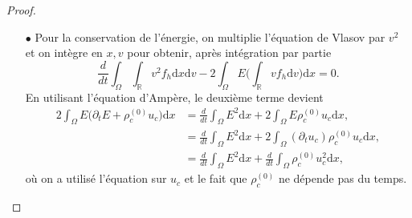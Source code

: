 \begin{proof}
\begin{enumerate}

    \item[$\bullet$] Pour la conservation de l'énergie, on multiplie l'équation de Vlasov par $v^2$ et on intègre en $x,v$ pour obtenir, après intégration par partie
      $$  
        \frac{d}{dt} \int_\Omega\int_{\mathbb{R}} v^2 f_h \mathrm{d}x \mathrm{d}v - 2 \int_\Omega E \Big(\int_{\mathbb{R}} v f_h \mathrm{d}v\Big)\mathrm{d}x = 0.
      $$
      En utilisant l'équation d'Ampère, le deuxième terme devient 
      $$
        \begin{aligned}
          2 \int_\Omega E \Big( \partial_t E + \rho^{(0)}_c u_c\Big)\mathrm{d}x
            &=  \frac{d}{dt} \int_\Omega E^2\mathrm{d}x  +2 \int_\Omega E \rho^{(0)}_c u_c \mathrm{d}x, \\
            &= \frac{d}{dt} \int_\Omega E^2\mathrm{d}x  + 2\int_\Omega (\partial_t u_c ) \rho^{(0)}_c u_c \mathrm{d}x, \\ 
            &= \frac{d}{dt} \int_\Omega E^2\mathrm{d}x  + \frac{d}{dt} \int_\Omega \rho_c^{(0)} u_c^2 \mathrm{d}x, 
        \end{aligned}
      $$
      où on a utilisé l'équation sur $u_c$ et le fait que $\rho_c^{(0)}$ ne dépende pas du temps. 
  \end{enumerate}
\end{proof}
